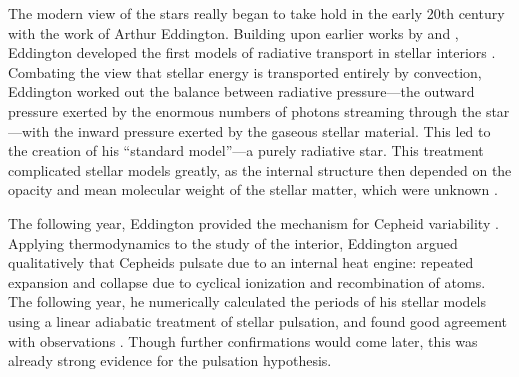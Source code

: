 The modern view of the stars really began to take hold in the early 20th century with the work of Arthur Eddington. 
Building upon earlier works by \citet{Schwarzschild1906} and \citet{1895MmRAS..51..123S}, Eddington developed the first models of radiative transport in stellar interiors \citep[e.g.,][]{1916MNRAS..77...16E}. 
Combating the view that stellar energy is transported entirely by convection, Eddington worked out the balance between radiative pressure---the outward pressure exerted by the enormous numbers of photons streaming through the star---with the inward pressure exerted by the gaseous stellar material. 
This led to the creation of his ``standard model''---a purely radiative star. 
This treatment complicated stellar models greatly, as the internal structure then depended on the opacity and mean molecular weight of the stellar matter, which were unknown \citep[e.g.,][]{ARNY1990211}. 


The following year, Eddington provided the mechanism for Cepheid variability \citep{1917Obs....40..290E}. 
Applying thermodynamics to the study of the interior, Eddington argued qualitatively that Cepheids pulsate due to an internal heat engine: repeated expansion and collapse due to cyclical ionization and recombination of atoms. 
The following year, he numerically calculated the periods of his stellar models using a linear adiabatic treatment of stellar pulsation, and found good agreement with observations \citep{1918MNRAS..79R...2E}. 
Though further confirmations would come later, this was already strong evidence for the pulsation hypothesis.%

